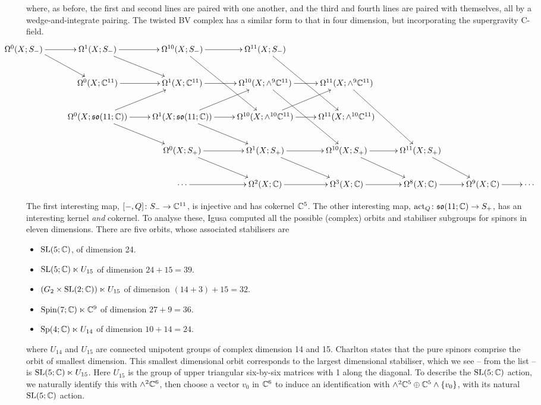 \documentclass[10pt, oneside]{article}
\begin{document}
\begin{landscape}
where, as before, the first and second lines are paired with one another, and the third and fourth lines are paired with themselves, all by a wedge-and-integrate pairing.  The twisted BV complex has a similar form to that in four dimension, but incorporating the supergravity C-field.
\[
\xymatrix{
\hspace*{-30pt}
\Omega^0(X; S_-) \ar[r] \ar[dr] &\Omega^1(X;S_-) \ar[r] \ar[dr] &\Omega^{10}(X; S_-) \ar[r] \ar[ddr] &\Omega^{11}(X;S_-) \ar[ddr] &&\\
&\Omega^0(X; \CC^{11}) \ar[r] &\Omega^1(X;\CC^{11}) \ar[r] &\Omega^{10}(X; \wedge^9\CC^{11}) \ar[r] \ar[ddr] &\Omega^{11}(X;\wedge^9\CC^{11}) \ar[ddr]&\\
&\Omega^0(X; \so(11;\CC)) \ar[r] \ar[ur] \ar[dr] &\Omega^1(X;\so(11;\CC)) \ar[r] \ar[ur] \ar[dr] &\Omega^{10}(X; \wedge^{10}\CC^{11}) \ar[r] \ar[ur] &\Omega^{11}(X;\wedge^{10}\CC^{11}) &\\
&&\Omega^0(X; S_+) \ar[r] \ar[rd] &\Omega^1(X;S_+) \ar[r] \ar[rd] &\Omega^{10}(X; S_+) \ar[r] \ar[rd] &\Omega^{11}(X;S_+) \ar[rd] \\
&&\cdots \ar[r] &\Omega^2(X;\CC) \ar[r] &\Omega^3(X;\CC) \ar[r] &\Omega^8(X;\CC) \ar[r] &\Omega^9(X;\CC) \ar[r] &\cdots \\
}
\]

The first interesting map, $[-,Q] \colon S_- \to \mathbb{C}^{11}$, is injective and has cokernel $\mathbb{C}^5$.  The other interesting map, $\mathrm{act}_Q \colon \mathfrak{so}(11;\mathbb{C}) \to S_+$, has an interesting kernel \emph{and} cokernel.  To analyse these, Igusa \cite{Igusa} computed all the possible (complex) orbits and stabiliser subgroups for spinors in eleven dimensions.  There are five orbits, whose associated stabilisers are
\begin{itemize}
 \item $\mathrm{SL}(5;\mathbb{C})$, of dimension 24.
 \item $\mathrm{SL}(5;\mathbb{C}) \ltimes U_{15}$ of dimension $24+15 = 39$.
 \item $(G_2 \times \mathrm{SL}(2;\mathbb{C})) \ltimes U_{15}$ of dimension $(14 + 3) + 15 = 32$.
 \item $\mathrm{Spin}(7;\mathbb{C}) \ltimes \mathbb{C}^9$ of dimension $27 + 9 = 36$.
 \item $\mathrm{Sp}(4;\mathbb{C}) \ltimes U_{14}$ of dimension $10 + 14 = 24$.
\end{itemize}
where $U_{14}$ and $U_{15}$ are connected unipotent groups of complex dimension 14 and 15.  Charlton \cite{Charlton} states that the pure spinors comprise the orbit of smallest dimension.  This smallest dimensional orbit corresponds to the largest dimensional stabiliser, which we see -- from the list -- is $\mathrm{SL}(5;\mathbb{C}) \ltimes U_{15}$.  Here $U_{15}$ is the group of upper triangular six-by-six matrices with 1 along the diagonal.  To describe the $\mathrm{SL}(5;\mathbb{C})$ action, we naturally identify this with $\wedge^2 \mathbb{C}^6$, then choose a vector $v_0$ in $\mathbb{C}^6$ to induce an identification with $\wedge^2 \mathbb{C}^5 \oplus \mathbb{C}^5 \wedge \{v_0\}$, with its natural $\mathrm{SL}(5;\mathbb{C})$ action.  
\end{landscape}
\end{document}
